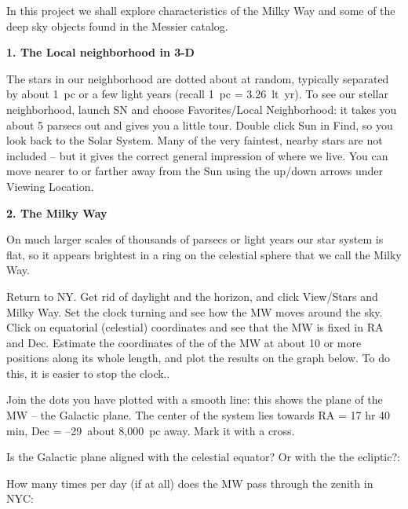 
\noindent
In this project we shall explore characteristics of the Milky Way and
some of the deep sky objects found in the Messier catalog.


\medskip \bigskip
\noindent
{\bf 1. The Local neighborhood in 3-D} 

\medskip\noindent
The stars in our neighborhood are dotted about at random, typically
separated by about 1~pc or a few light years (recall 1~pc =
3.26~lt~yr).  To see our stellar neighborhood, launch SN and choose
Favorites/Local Neighborhood: it takes you about 5 parsecs out and
gives you a little tour.  Double click Sun in Find, so you look back
to the Solar System.  Many of the very faintest, nearby stars are not
included -- but it gives the correct general impression of where we
live. You can move nearer to or farther away from the Sun using the
up/down arrows under Viewing Location.


\bigskip
\noindent
{\bf 2. The Milky Way} 

\medskip\noindent
On much larger scales of thousands of parsecs or light years our star
system is flat, so it appears brightest in a ring on the celestial
sphere that we call the Milky Way.

Return to NY. Get rid of daylight and the horizon, and click
View/Stars and Milky Way. Set the clock turning and see how the MW moves
around the sky.  Click on equatorial (celestial) coordinates and see
that the MW is fixed in RA and Dec. Estimate the coordinates of the of
the MW at about 10 or more positions along its whole length, and plot the
results on the graph below. To do this, it is easier to stop the clock..

\vspace{0.1cm}

\begin{figure*}[h]
        \centerline{}
        \caption{}
         \end{figure*}

\newpage
\noindent
Join the dots you have plotted with a smooth line: this
shows the plane of the MW -- the Galactic plane. The
center of the system lies towards  RA = 17 hr 40
min, Dec = --29\deg\ about 8,000~pc away. Mark it with a cross.

\bigskip
\noindent
Is the Galactic plane aligned with the celestial equator? Or with the
the ecliptic?: \\ \makebox[4cm]{\hrulefill}

\bigskip
\noindent
How many times per day (if at all) does the MW pass through the zenith in NYC:
\makebox[4cm]{\hrulefill}


